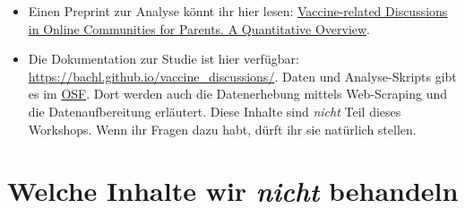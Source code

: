 \documentclass[
]{book}
\providecommand{\tightlist}{%
  \setlength{\itemsep}{0pt}\setlength{\parskip}{0pt}}
\begin{document}
\begin{itemize}
  \begin{itemize}
  \tightlist
  \item
    Einen Preprint zur Analyse könnt ihr hier lesen: \href{https://osf.io/ad9h7/}{Vaccine-related Discussions in Online Communities for Parents. A Quantitative Overview}.
  \item
    Die Dokumentation zur Studie ist hier verfügbar: \url{https://bachl.github.io/vaccine_discussions/}. Daten und Analyse-Skripts gibt es im \href{https://osf.io/twx38/}{OSF}. Dort werden auch die Datenerhebung mittels Web-Scraping und die Datenaufbereitung erläutert. Diese Inhalte sind \emph{nicht} Teil dieses Workshops. Wenn ihr Fragen dazu habt, dürft ihr sie natürlich stellen.
  \end{itemize}
\end{itemize}

\hypertarget{welche-inhalte-wir-nicht-behandeln}{%
\section{\texorpdfstring{Welche Inhalte wir \emph{nicht} behandeln}{Welche Inhalte wir nicht behandeln}}\label{welche-inhalte-wir-nicht-behandeln}}
\end{document}

